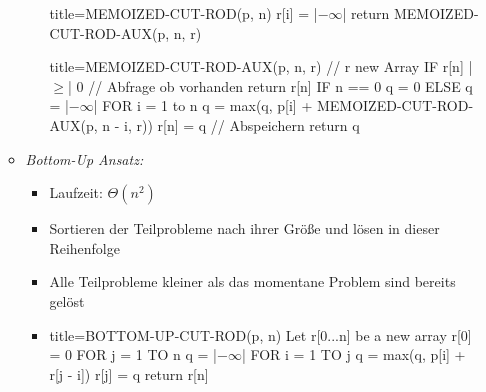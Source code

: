 \documentclass[
    12pt,
    a4paper,
    ngerman,
    color=3b,%
    marginpar=false,
    colorback=false,
    leqno,
]{tudaexercise}
\begin{document}
\begin{itemize}
\begin{itemize}
\begin{itemize}
\begin{ccode}[autogobble,escapeinside=||]{title={MEMOIZED-CUT-ROD(p, n)}}
                                r[i] = |$-\infty$|
                            return MEMOIZED-CUT-ROD-AUX(p, n, r)
                        \end{ccode}
                        \begin{ccode}[autogobble,escapeinside=||]{title={MEMOIZED-CUT-ROD-AUX(p, n, r)       // r new Array}}
                            IF r[n] |$\geq$| 0                        // Abfrage ob vorhanden
                                return r[n]
                            IF n == 0
                                q = 0
                            ELSE
                                q = |$-\infty$|
                                FOR i = 1 to n
                                q = max(q, p[i] + MEMOIZED-CUT-ROD-AUX(p, n - i, r))
                            r[n] = q                            // Abspeichern
                            return q
                            \end{ccode}
                    \end{itemize}
\pagebreak
                \item \textit{Bottom-Up Ansatz:}
                    \begin{itemize}
                        \item Laufzeit: $\Theta(n^2)$
                        \item Sortieren der Teilprobleme nach ihrer Grö\ss e und lösen in dieser Reihenfolge
                        \item Alle Teilprobleme kleiner als das momentane Problem sind bereits gelöst
                        \item[]\hspace*{-2.4cm}\begin{minipage}{.45\textwidth}
                            \begin{ccode}[autogobble,escapeinside=||]{title={BOTTOM-UP-CUT-ROD(p, n)}}
                            Let r[0...n] be a new array
                            r[0] = 0
                            FOR j = 1 TO n
                                q = |$-\infty$|
                                FOR i = 1 TO j
                                    q = max(q, p[i] + r[j - i])
                                r[j] = q
                            return r[n]
                            \end{ccode}
                        \end{minipage}
                        \begin{minipage}{.55\textwidth}

\end{minipage}
\end{itemize}
\end{itemize}
\end{itemize}
\end{document}
